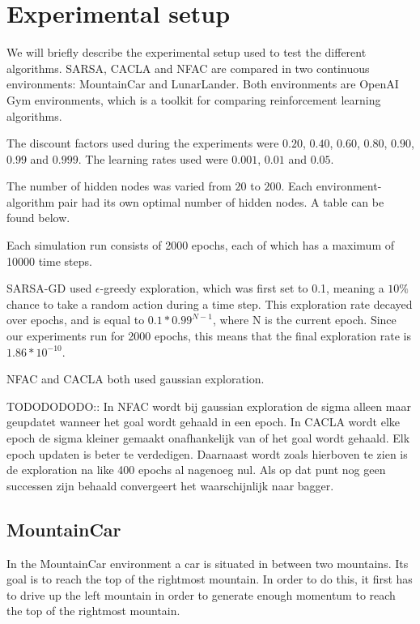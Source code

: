  
\section{Experimental setup}

We will briefly describe the experimental setup used to test the different algorithms. SARSA, CACLA and NFAC are compared in two continuous environments: MountainCar\cite{openaimountaincar} and LunarLander\cite{openailunarlander}. Both environments are OpenAI Gym environments\cite{openaigym}, which is a toolkit for comparing reinforcement learning algorithms. 

The discount factors used during the experiments were $0.20$, $0.40$, $0.60$, $0.80$, $0.90$, $0.99$ and $0.999$. The learning rates used were $0.001$, $0.01$ and $0.05$.

The number of hidden nodes was varied from $20$ to $200$. Each environment-algorithm pair had its own optimal number of hidden nodes. A table can be found below. 

Each simulation run consists of 2000 epochs, each of which has a maximum of 10000 time steps. 


SARSA-GD used $\epsilon$-greedy exploration, which was first set to 0.1, meaning a $10\%$ chance to take a random action during a time step. This exploration rate decayed over epochs, and is equal to $0.1 * 0.99^{N-1}$, where N is the current epoch. Since our experiments run for 2000 epochs, this means that the final exploration rate is $1.86*10^{-10}$.   

NFAC and CACLA both used gaussian exploration. 

TODODODODO:: In NFAC wordt bij gaussian exploration de sigma alleen maar geupdatet wanneer het goal wordt gehaald in een epoch. In CACLA wordt elke epoch de sigma kleiner gemaakt onafhankelijk van of het goal wordt gehaald. Elk epoch updaten is beter te verdedigen. Daarnaast wordt zoals hierboven te zien is de exploration na like 400 epochs al nagenoeg nul. Als op dat punt nog geen successen zijn behaald convergeert het waarschijnlijk naar bagger. 


\subsection{MountainCar}
In the MountainCar environment a car is situated in between two mountains. Its goal is to reach the top of the rightmost mountain. In order to do this, it first has to drive up the left mountain in order to generate enough momentum to reach the top of the rightmost mountain. 


